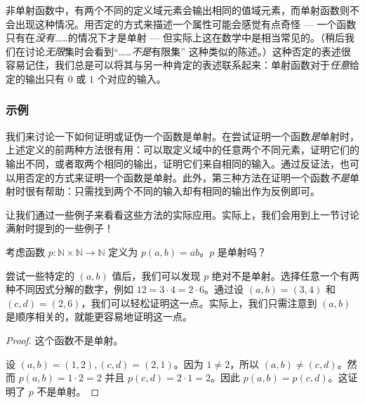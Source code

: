 \begin{multicols}{2}
\begin{center}
    \end{center}
\end{multicols}

非单射函数中，有两个不同的定义域元素会输出相同的值域元素，而单射函数则不会出现这种情况。用否定的方式来描述一个属性可能会感觉有点奇怪 --- 一个函数只有在\emph{没有}……的情况下才是单射 --- 但实际上这在数学中是相当常见的。（稍后我们在讨论\emph{无限}集时会看到``……\emph{不是}有限集'' 这种类似的陈述。）这种否定的表述很容易记住，我们总是可以将其与另一种肯定的表述联系起来：单射函数对于\emph{任意}给定的输出只有 $0$ 或 $1$ 个对应的输入。

\subsubsection*{示例}

我们来讨论一下如何证明或证伪一个函数是单射。在尝试证明一个函数\emph{是}单射时，上述定义的前两种方法很有用：可以取定义域中的任意两个不同元素，证明它们的输出不同，或者取两个相同的输出，证明它们来自相同的输入。通过反证法，也可以用否定的方式来证明一个函数是单射。此外，第三种方法在证明一个函数\emph{不是}单射时很有帮助：只需找到两个不同的输入却有相同的输出作为反例即可。

让我们通过一些例子来看看这些方法的实际应用。实际上，我们会用到上一节讨论满射时提到的一些例子！\\

\begin{example}
    考虑函数 $p : \mathbb{N} \times \mathbb{N} \to \mathbb{N}$ 定义为 $p(a,b) = ab$。$p$ 是单射吗？

    尝试一些特定的 $(a, b)$ 值后，我们可以发现 $p$ 绝对不是单射。选择任意一个有两种不同因式分解的数字，例如 $12 = 3 \cdot 4 = 2 \cdot 6$。通过设 $(a, b) = (3, 4)$ 和 $(c, d) = (2, 6)$，我们可以轻松证明这一点。实际上，我们只需注意到 $(a, b)$ 是顺序相关的，就能更容易地证明这一点。

    \begin{proof}
        这个函数不是单射。

        设 $ (a, b) = (1, 2), (c, d) = (2, 1)$。因为 $1 \ne 2$，所以 $ (a, b) \ne (c, d)$。然而 $p(a, b) = 1 \cdot 2 = 2$ 并且 $p(c, d) = 2 \cdot 1 = 2$。因此 $p(a, b) = p(c, d)$。这证明了 $p$ 不是单射。
    \end{proof}
\end{example}

